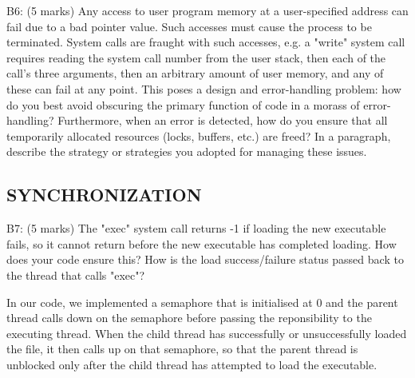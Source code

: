 
\noindent B6: (5 marks)
Any access to user program memory at a user-specified address
can fail due to a bad pointer value.  Such accesses must cause the process to be terminated. System calls are fraught with such
accesses, e.g. a "write" system call requires reading the system
call number from the user stack, then each of the call's three
arguments, then an arbitrary amount of user memory, and any of
these can fail at any point.  This poses a design and
error-handling problem: how do you best avoid obscuring the primary
function of code in a morass of error-handling?  Furthermore, when
an error is detected, how do you ensure that all temporarily
allocated resources (locks, buffers, etc.) are freed?  In a
paragraph, describe the strategy or strategies you adopted for
managing these issues.





\subsection*{SYNCHRONIZATION}

\noindent B7: (5 marks)
The "exec" system call returns -1 if loading the new executable
fails, so it cannot return before the new executable has completed
loading.  How does your code ensure this?  How is the load
success/failure status passed back to the thread that calls "exec"?



In our code, we implemented a semaphore that is initialised at 0 and the parent thread calls down on the semaphore before passing the reponsibility to the executing thread. When the child thread has successfully or unsuccessfully loaded the file, it then calls up on that semaphore, so that the parent thread is unblocked only after the child thread has attempted to load the executable.


